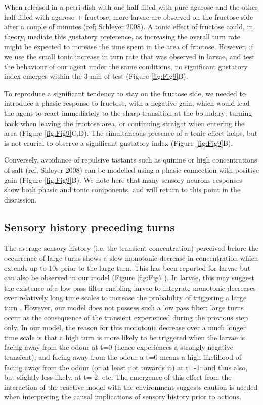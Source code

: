 \documentclass[10pt,a4paper]{article}
\begin{document}
When released in a petri dish with one half filled with pure agarose and the other half filled with agarose + fructose, more larvae are observed on the fructose side after a couple of minutes (ref; Schleyer 2008). A tonic effect of fructose could, in theory, mediate this gustatory preference, as increasing the overall turn rate might be expected to increase the time spent in the area of fructose. However, if we use the small tonic increase in turn rate that was observed in larvae, and test the behaviour of our agent under the same conditions, no significant gustatory index emerges within the 3 min of test (Figure \ref{fig:Fig9}B).

 To reproduce a significant tendency to stay on the fructose side, we needed to introduce a phasic response to fructose, with a negative gain, which would lead the agent to react immediately to the sharp transition at the boundary; turning back when leaving the fructose area, or continuing straight when entering the area (Figure \ref{fig:Fig9}C,D). The simultaneous presence of a tonic effect helps, but is not crucial to observe a significant gustatory index (Figure \ref{fig:Fig9}B).

  Conversely, avoidance of repulsive tastants such as quinine or high concentrations of salt (ref, Shleyer 2008) can be modelled using a phasic connection with positive gain (Figure \ref{fig:Fig9}B). We note here that many sensory neurons responses show both phasic and tonic components, and will return to this point in the discussion.

\subsection{Sensory history preceding turns}
The average sensory history (i.e. the transient concentration) perceived before the occurrence of large turns shows a slow monotonic decrease in concentration which extends up to 10s prior to the large turn. This has been reported for larvae  \citep{gomez2011active} but can also be observed in our model (Figure \ref{fig:Fig7}). In larvae, this may suggest the existence of a low pass filter enabling larvae to integrate monotonic decreases over relatively long time scales to increase the probability of triggering a large turn \citep{gomez2011active,davies2015model}. However, our model does not possess such a low pass filter: large turns occur as the consequence of the transient experienced during the previous step only. In our model, the reason for this monotonic decrease over a much longer time scale is that a high turn is more likely to be triggered when the larvae is facing away from the odour at t=0 (hence experiences a strongly negative transient); and facing away from the odour a t=0 means a high likelihood of facing away from the odour (or at least not towards it) at t=-1; and thus also, but slightly less likely, at t=-2; etc. The emergence of this effect from the interaction of the reactive model with the environment suggests caution is needed when interpreting the causal implications of sensory history prior to actions.
\end{document}
